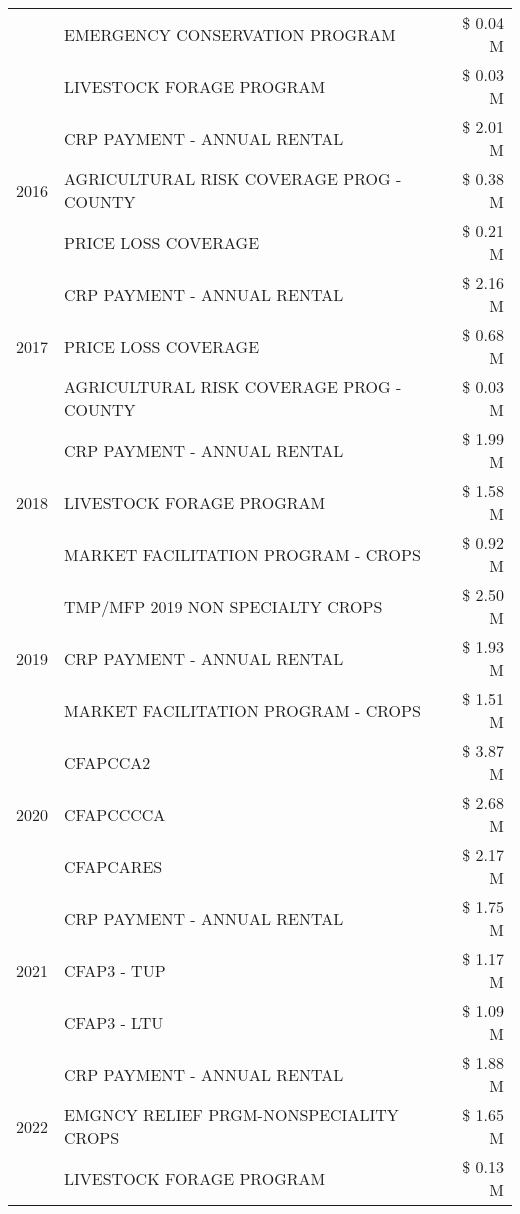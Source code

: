 \begin{tabular}{llr}
 & EMERGENCY CONSERVATION PROGRAM & \$ 0.04 M \\
 & LIVESTOCK FORAGE PROGRAM & \$ 0.03 M \\
\cline{1-3}
\multirow[t]{3}{*}{2016} & CRP PAYMENT - ANNUAL RENTAL & \$ 2.01 M \\
 & AGRICULTURAL RISK COVERAGE PROG - COUNTY & \$ 0.38 M \\
 & PRICE LOSS COVERAGE & \$ 0.21 M \\
\cline{1-3}
\multirow[t]{3}{*}{2017} & CRP PAYMENT - ANNUAL RENTAL & \$ 2.16 M \\
 & PRICE LOSS COVERAGE & \$ 0.68 M \\
 & AGRICULTURAL RISK COVERAGE PROG - COUNTY & \$ 0.03 M \\
\cline{1-3}
\multirow[t]{3}{*}{2018} & CRP PAYMENT - ANNUAL RENTAL & \$ 1.99 M \\
 & LIVESTOCK FORAGE PROGRAM & \$ 1.58 M \\
 & MARKET FACILITATION PROGRAM - CROPS & \$ 0.92 M \\
\cline{1-3}
\multirow[t]{3}{*}{2019} & TMP/MFP 2019 NON SPECIALTY CROPS & \$ 2.50 M \\
 & CRP PAYMENT - ANNUAL RENTAL & \$ 1.93 M \\
 & MARKET FACILITATION PROGRAM - CROPS & \$ 1.51 M \\
\cline{1-3}
\multirow[t]{3}{*}{2020} & CFAPCCA2 & \$ 3.87 M \\
 & CFAPCCCCA & \$ 2.68 M \\
 & CFAPCARES & \$ 2.17 M \\
\cline{1-3}
\multirow[t]{3}{*}{2021} & CRP PAYMENT - ANNUAL RENTAL & \$ 1.75 M \\
 & CFAP3 - TUP & \$ 1.17 M \\
 & CFAP3 - LTU & \$ 1.09 M \\
\cline{1-3}
\multirow[t]{3}{*}{2022} & CRP PAYMENT - ANNUAL RENTAL & \$ 1.88 M \\
 & EMGNCY RELIEF PRGM-NONSPECIALITY CROPS & \$ 1.65 M \\
 & LIVESTOCK FORAGE PROGRAM & \$ 0.13 M \\
\cline{1-3}
\bottomrule
\end{tabular}
